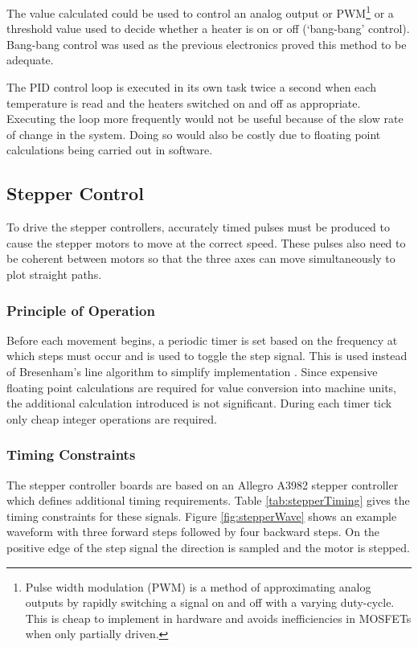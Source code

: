 				The value calculated could be used to control an analog output or
				PWM\footnote{Pulse width modulation (PWM) is a method of approximating
				analog outputs by rapidly switching a signal on and off with a varying
				duty-cycle. This is cheap to implement in hardware and avoids
				inefficiencies in MOSFETs when only partially driven.} or a threshold
				value used to decide whether a heater is on or off (`bang-bang'
				control). Bang-bang control was used as the previous electronics proved
				this method to be adequate.
				
				The PID control loop is executed in its own task twice a second when
				each temperature is read and the heaters switched on and off as
				appropriate. Executing the loop more frequently would not be useful
				because of the slow rate of change in the system. Doing so would also be
				costly due to floating point calculations being carried out in software.
		
		\subsection{Stepper Control}
			
			To drive the stepper controllers, accurately timed pulses must be produced
			to cause the stepper motors to move at the correct speed. These pulses
			also need to be coherent between motors so that the three axes can move
			simultaneously to plot straight paths.
			
			\subsubsection{Principle of Operation}
			
			Before each movement begins, a periodic timer is set based on the
			frequency at which steps must occur and is used to toggle the step signal.
			This is used instead of Bresenham's line algorithm to simplify
			implementation \cite{bresenham}.  Since expensive floating point
			calculations are required for value conversion into machine units, the
			additional calculation introduced is not significant. During each timer
			tick only cheap integer operations are required.
			
			\subsubsection{Timing Constraints}
				
				The stepper controller boards are based on an Allegro A3982 stepper
				controller which defines additional timing requirements. Table
				\ref{tab:stepperTiming} gives the timing constraints for these signals.
				Figure \ref{fig:stepperWave} shows an example waveform with three
				forward steps followed by four backward steps. On the positive edge of
				the step signal the direction is sampled and the motor is stepped.
				
